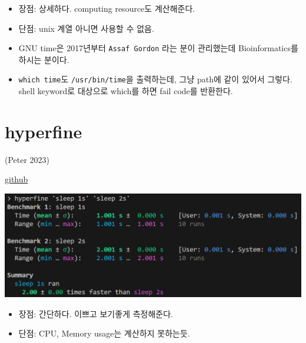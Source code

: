 \documentclass[
  letterpaper,
]{scrbook}
\providecommand{\tightlist}{%
  \setlength{\itemsep}{0pt}\setlength{\parskip}{0pt}}\usepackage{longtable,booktabs,array}
\begin{document}
\begin{itemize}
\tightlist
\item
  장점: 상세하다. computing resource도 계산해준다.
\item
  단점: unix 계열 아니면 사용할 수 없음.
\end{itemize}

\begin{tcolorbox}[enhanced jigsaw, opacityback=0, bottomrule=.15mm, toptitle=1mm, colback=white, colframe=quarto-callout-tip-color-frame, breakable, colbacktitle=quarto-callout-tip-color!10!white, opacitybacktitle=0.6, bottomtitle=1mm, left=2mm, coltitle=black, titlerule=0mm, rightrule=.15mm, title=\textcolor{quarto-callout-tip-color}{\faLightbulb}\hspace{0.5em}{TMI}, arc=.35mm, toprule=.15mm, leftrule=.75mm]

\begin{itemize}
\tightlist
\item
  GNU time은 2017년부터 \texttt{Assaf\ Gordon} 라는 분이 관리했는데
  Bioinformatics를 하시는 분이다.👀
\item
  \texttt{which\ time}도 \texttt{/usr/bin/time}을 출력하는데, 그냥
  path에 같이 있어서 그렇다. shell keyword로 대상으로 which를 하면 fail
  code를 반환한다.
\end{itemize}

\end{tcolorbox}

\section*{hyperfine}\label{hyperfine}


(Peter 2023)

\href{https://github.com/sharkdp/hyperfine}{github}

\includegraphics{chapters/ComputerScience/benchmarking/hyperfine_example.png}

\begin{itemize}
\tightlist
\item
  장점: 간단하다. 이쁘고 보기좋게 측정해준다.
\item
  단점: CPU, Memory usage는 계산하지 못하는듯.
\end{itemize}
\end{document}
